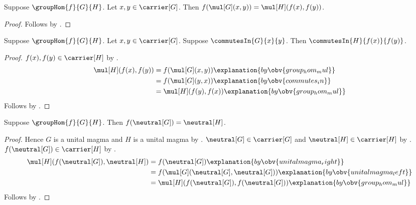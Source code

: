 \begin{proposition}\label{group_hom_mul}
    Suppose $\groupHom{f}{G}{H}$.
    Let $x,y\in\carrier[G]$.
    Then $f(\mul[G](x,y))=\mul[H](f(x),f(y))$.
\end{proposition}
\begin{proof}
    Follows by .
\end{proof}

\begin{theorem}\label{group_hom_preserves_commutes}
    Suppose $\groupHom{f}{G}{H}$.
    Let $x,y\in\carrier[G]$.
    Suppose $\commutesIn{G}{x}{y}$.
    Then $\commutesIn{H}{f(x)}{f(y)}$.
\end{theorem}
\begin{proof}
    $f(x),f(y)\in\carrier[H]$ by .
    \begin{align*}
        \mul[H](f(x),f(y))
            &= f(\mul[G](x,y)) \explanation{by \obv{group_hom_mul}}
            \\
            &= f(\mul[G](y,x)) \explanation{by \obv{commutes_in}}
            \\
            &= \mul[H](f(y),f(x)) \explanation{by \obv{group_hom_mul}}
    \end{align*}
    Follows by .
\end{proof}

\begin{theorem}\label{group_hom_neutral}
    Suppose $\groupHom{f}{G}{H}$.
    Then $f(\neutral[G])=\neutral[H]$.
\end{theorem}
\begin{proof}
    Hence $G$ is a unital magma and $H$ is a unital magma by
        .
    $\neutral[G]\in\carrier[G]$ and
        $\neutral[H]\in\carrier[H]$ by
        .
    $f(\neutral[G])\in\carrier[H]$ by
        .
    \begin{align*}
        \mul[H](f(\neutral[G]),\neutral[H])
            &= f(\neutral[G]) \explanation{by \obv{unitalmagma_right}}
            \\
            &= f(\mul[G](\neutral[G],\neutral[G]))
                \explanation{by \obv{unitalmagma_left}}
            \\
            &= \mul[H](f(\neutral[G]),f(\neutral[G]))
                \explanation{by \obv{group_hom_mul}}
    \end{align*}
    Follows by .
\end{proof}

